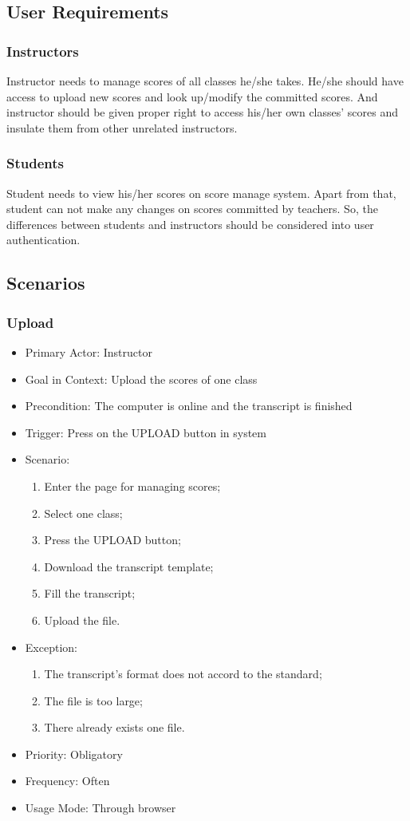 \documentclass[a4]{article}
\begin{document}
\subsection{User Requirements}
\subsubsection{Instructors}
Instructor needs to manage scores of all classes he/she takes. He/she should have access to upload new scores and look up/modify the committed scores. And instructor should be given proper right to access his/her own classes' scores and insulate them from other
unrelated instructors.
\subsubsection{Students}
Student needs to view his/her scores on score manage system. Apart from that, student can not make any changes on scores committed by teachers. So, the differences between students and instructors should be considered into user authentication.
\subsection{Scenarios}
\subsubsection{Upload}
\begin{itemize}
\item Primary Actor: Instructor
\item Goal in Context: Upload the scores of one class
\item Precondition: The computer is online and  the transcript is finished
\item Trigger: Press on the UPLOAD button in system
\item Scenario: 
\begin{enumerate}
\item Enter the page for managing scores;
\item Select one class;
\item Press the UPLOAD button;
\item Download the transcript template;
\item Fill the transcript;
\item Upload the file.
\end{enumerate}
\item Exception:
\begin{enumerate}
\item The transcript's format does not accord to the standard;
\item The file is too large;
\item There already exists one file.
\end{enumerate}
\item Priority: Obligatory
\item Frequency: Often
\item Usage Mode: Through browser
\end{itemize}
\end{document}
